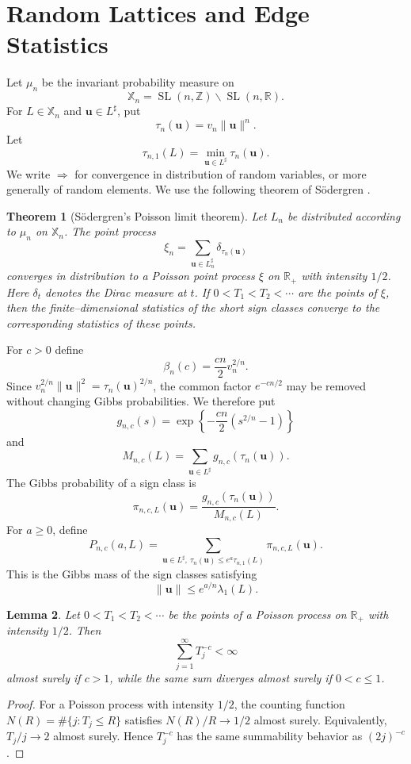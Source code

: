 \documentclass[a4paper,12pt]{article}
\newtheorem{thm}{Theorem}
\newtheorem{lem}[thm]{Lemma}
\theoremstyle{definition}
\theoremstyle{remark}
\newcommand{\re}{\mathbb R}
\newcommand{\ze}{\mathbb Z}
\newcommand{\SL}{\operatorname{SL}}
\begin{document}
\section{Random Lattices and Edge Statistics}
\label{sec:random}

Let $\mu_n$ be the invariant probability measure on
$$
\mathbb X_n=\SL(n,\ze)\backslash\SL(n,\re).
$$
For $L\in\mathbb X_n$ and $\bm u\in L^\sharp$, put
$$
\tau_n(\bm u)=v_n\|\bm u\|^n.
$$
Let
$$
\tau_{n,1}(L)=\min_{\bm u\in L^\sharp}\tau_n(\bm u).
$$
We write $\Rightarrow$ for convergence in distribution of random variables,
or more generally of random elements.
We use the following theorem of S\"odergren \cite{Sodergren11}.

\begin{thm}[S\"odergren's Poisson limit theorem]
\label{thm:sodergren}
Let $L_n$ be distributed according to $\mu_n$ on $\mathbb X_n$.
The point process
$$
\xi_n=\sum_{\bm u\in L_n^\sharp}\delta_{\tau_n(\bm u)}
$$
converges in distribution to a Poisson point process $\xi$ on $\re_+$ with intensity $1/2$.
Here $\delta_t$ denotes the Dirac measure at $t$.
If $0<T_1<T_2<\cdots$ are the points of $\xi$, then the finite--dimensional statistics of the short sign classes converge to the corresponding statistics of these points.
\end{thm}

For $c>0$ define
$$
\beta_n(c)=\frac{cn}{2}v_n^{2/n}.
$$
Since $v_n^{2/n}\|\bm u\|^2=\tau_n(\bm u)^{2/n}$, the common factor $e^{-cn/2}$ may be removed without changing Gibbs probabilities.
We therefore put
$$
g_{n,c}(s)=\exp\left\{-\frac{cn}{2}(s^{2/n}-1)\right\}
$$
and
$$
M_{n,c}(L)=\sum_{\bm u\in L^\sharp}g_{n,c}(\tau_n(\bm u)).
$$
The Gibbs probability of a sign class is
$$
\pi_{n,c,L}(\bm u)=
\frac{g_{n,c}(\tau_n(\bm u))}{M_{n,c}(L)}.
$$
For $a\ge0$, define
$$
P_{n,c}(a,L)=
\sum_{\bm u\in L^\sharp,\ \tau_n(\bm u)\le e^a\tau_{n,1}(L)}
\pi_{n,c,L}(\bm u).
$$
This is the Gibbs mass of the sign classes satisfying
$$
\|\bm u\|\le e^{a/n}\lambda_1(L).
$$

\begin{lem}
\label{lem:powersum}
Let $0<T_1<T_2<\cdots$ be the points of a Poisson process on $\re_+$ with intensity $1/2$.
Then
$$
\sum_{j=1}^{\infty}T_j^{-c}<\infty
$$
almost surely if $c>1$, while the same sum diverges almost surely if $0<c\le1$.
\end{lem}

\begin{proof}
For a Poisson process with intensity $1/2$, the counting function $N(R)=\#\{j:T_j\le R\}$ satisfies $N(R)/R\to1/2$ almost surely.
Equivalently, $T_j/j\to2$ almost surely.
Hence $T_j^{-c}$ has the same summability behavior as $(2j)^{-c}$.
\end{proof}
\end{document}
